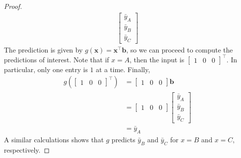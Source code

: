 \documentclass[12pt]{article}
\begin{document}
\begin{enumerate}
\begin{proof}
\begin{align*}
\begin{bmatrix}
			\bar{y}_A\\
			\bar{y}_B\\
			\bar{y}_C
		\end{bmatrix}
	\end{align*}
	The prediction is given by $g(\mathbf{x})=\mathbf{x}^\top \mathbf{b}$,
	so we can proceed to compute the predictions of interest. Note that
	if $x=A$, then the input is $\begin{bmatrix}
		1 & 0 & 0
	\end{bmatrix}^\top$. In particular, only one entry is $1$ at a time.
	Finally,
	\begin{align*}
		g\left(\begin{bmatrix}
			1 & 0 & 0
		\end{bmatrix}^\top\right)
		&=\begin{bmatrix}
			1 & 0 & 0
		\end{bmatrix}
		\mathbf{b}\\
		&=\begin{bmatrix}
			1 & 0 & 0
		\end{bmatrix}
		\begin{bmatrix}
			\bar{y}_A\\
			\bar{y}_B\\
			\bar{y}_C
		\end{bmatrix}\\
		&=\bar{y}_A
	\end{align*}
	A similar calculations shows that $g$ predicts $\bar{y}_B$ and $\bar{y}_C$ for
	$x=B$ and $x=C$, respectively.
\end{proof}



\end{enumerate}
\end{document}
